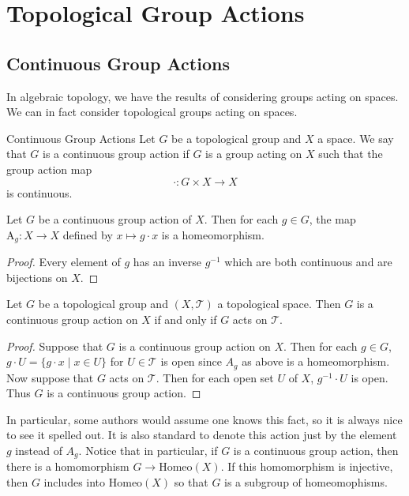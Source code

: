 \documentclass[a4paper]{article}
\begin{document}
\pagebreak
\section{Topological Group Actions}
\subsection{Continuous Group Actions}
In algebraic topology, we have the results of considering groups acting on spaces. We can in fact consider topological groups acting on spaces. 

\begin{defn}{Continuous Group Actions}{} Let $G$ be a topological group and $X$ a space. We say that $G$ is a continuous group action if $G$ is a group acting on $X$ such that the group action map $$\cdot:G\times X\to X$$ is continuous. 
\end{defn}

\begin{prp}{}{} Let $G$ be a continuous group action of $X$. Then for each $g\in G$, the map $\text{A}_g:X\to X$ defined by $x\mapsto g\cdot x$ is a homeomorphism. \tcbline
\begin{proof}
Every element of $g$ has an inverse $g^{-1}$ which are both continuous and are bijections on $X$. 
\end{proof}
\end{prp}

\begin{prp}{}{} Let $G$ be a topological group and $(X,\mathcal{T})$ a topological space. Then $G$ is a continuous group action on $X$ if and only if $G$ acts on $\mathcal{T}$. \tcbline
\begin{proof}
Suppose that $G$ is a continuous group action on $X$. Then for each $g\in G$, $g\cdot U=\{g\cdot x\;|\; x\in U\}$ for $U\in\mathcal{T}$ is open since $A_g$ as above is a homeomorphism. Now suppose that $G$ acts on $\mathcal{T}$. Then for each open set $U$ of $X$, $g^{-1}\cdot U$ is open. Thus $G$ is a continuous group action. 
\end{proof}
\end{prp}

In particular, some authors would assume one knows this fact, so it is always nice to see it spelled out. It is also standard to denote this action just by the element $g$ instead of $A_g$. Notice that in particular, if $G$ is a continuous group action, then there is a homomorphism $G\to\text{Homeo}(X)$. If this homomorphism is injective, then $G$ includes into $\text{Homeo}(X)$ so that $G$ is a subgroup of homeomophisms. 
\end{document}
